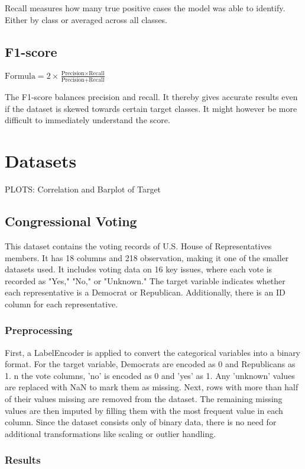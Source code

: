 \documentclass{article}
\begin{document}
Recall measures how many true positive cases the model was able to identify. Either by class or averaged
across all classes.

\subsection{F1-score}

$\text{Formula}  = 2 \times \frac{\text{Precision} \times \text{Recall}}{\text{Precision} + \text{Recall}}$

The F1-score balances precision and recall. It thereby gives accurate results even if the dataset is skewed towards certain target classes. It might however be more difficult to immediately understand the score.

\section{Datasets}
PLOTS: Correlation and Barplot of Target

\subsection{Congressional Voting}
This dataset contains the voting records of U.S. House of Representatives members. It has 18 columns and 218 observation, making it one of the smaller datasets used. It includes voting data on 16 key issues, where each vote is recorded as "Yes," "No," or "Unknown." The target variable indicates whether each representative is a Democrat or Republican. Additionally, there is an ID column for each representative.


\subsubsection{Preprocessing}
First, a LabelEncoder is applied to convert the categorical variables into a binary format.  For the target variable, Democrats are encoded as 0 and Republicans as 1.  n the vote columns, 'no' is encoded as 0 and 'yes' as 1. Any 'unknown' values are replaced with NaN to mark them as missing. Next, rows with more than half of their values missing are removed from the dataset. The remaining missing values are then imputed by filling them with the most frequent value in each column. Since the dataset consists only of binary data, there is no need for additional transformations like scaling or outlier handling. 

\subsubsection{Results}
\end{document}
